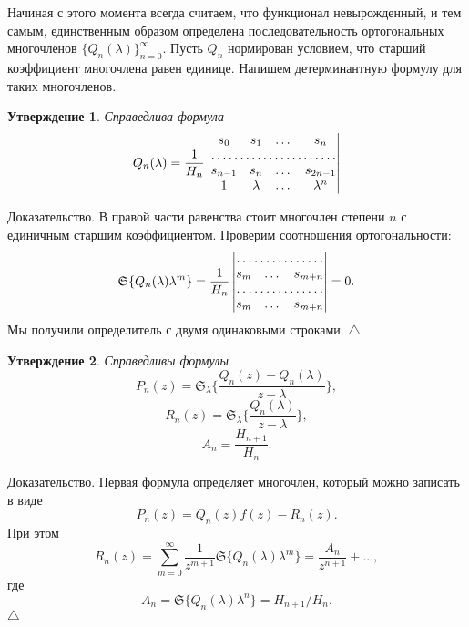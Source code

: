 \documentclass[12 pt, a4 paper]{article}
\theoremstyle{plain}   \newtheorem{Pro}{Задача}
\newtheorem{Sta}{Утверждение}
\begin{document}
Начиная с этого момента всегда считаем, что функционал
невырожденный, и тем самым, единственным образом
определена последовательность ортогональных многочленов
$ \{ Q_n (\lambda ) \} _{n=0}^{\infty}. $
Пусть
$  Q_n $
нормирован условием, что старший коэффициент многочлена равен
единице. Напишем детерминантную формулу для таких многочленов.
\begin{Sta}
Справедлива формула
\begin{equation*}
   Q_n (\lambda )=
  \frac{1}{H_n }
    \begin{vmatrix}
	  s_0 & s_1 & \dots & s_n \\
	  \hdotsfor{4}\\
	  s_{n-1} & s_n & \dots & s_{2n-1}\\
	  1 & \lambda & \dots & \lambda ^n
	\end{vmatrix}
\end{equation*}
\end{Sta}
{\Large Доказательство.}
В правой части равенства стоит многочлен степени
$ n $
с единичным старшим коэффициентом. Проверим соотношения ортогональности:
\begin{equation*}
  \mathfrak{S} \{  Q_n (\lambda ) \lambda ^m \} =
  \frac{1}{H_n }
    \begin{vmatrix}
	  \hdotsfor{3}\\
	  s_m & \dots & s_{m+n}\\
	  \hdotsfor{3}\\
	  s_m & \dots & s_{m+n}
	\end{vmatrix}
  =0.
\end{equation*}
Мы получили определитель с двумя одинаковыми строками.
$ \triangle $
\begin{Sta}
Справедливы формулы
$$
   P_n (z) =
  \mathfrak{S}_{\lambda }
  \biggl \{
  \frac{ Q_n (z) -  Q_n (\lambda )}
  {z-\lambda}
  \biggr \} ,
$$
$$
   R_n (z) =
  \mathfrak{S}_{\lambda}
  \biggl \{
  \frac{ Q_n (\lambda )}
  {z-\lambda}
  \biggr \} ,
$$
$$
   A_n =
  \frac{H_{n+1}}{H_n }.
$$
\end{Sta}
{\Large Доказательство.}
Первая формула определяет многочлен, который можно записать
в виде
$$
   P_n (z)=
   Q_n (z)f(z)-  R_n (z).
$$
При этом
$$
   R_n (z)=
  \sum _{m=0}^{\infty}
  \frac{1}{z^{m+1}}
  \mathfrak{S} \{  Q_n (\lambda ) \lambda ^m \}
  =\frac{ A_n }{z^{n+1}}+...,
$$
где
$$
   A_n =
  \mathfrak{S} \{  Q_n (\lambda ) \lambda ^n \}=
  H_{n+1}/H_n .
$$
$ \triangle $
\newpage
\end{document}
